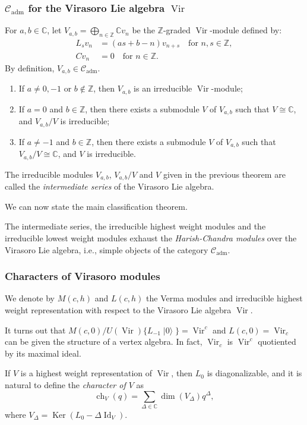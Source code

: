 \documentclass{beamer}
\DeclareMathOperator{\Id}{Id}
\DeclareMathOperator{\Ker}{Ker}
\DeclareMathOperator{\adm}{adm}
\DeclareMathOperator{\Vir}{Vir}
\DeclareMathOperator{\vac}{|0\rangle}
\DeclareMathOperator{\ch}{ch}
\begin{document}
\begin{frame}
  \frametitle{$\mathcal{C}_{\adm}$ for the Virasoro Lie algebra $\Vir$}
  For $a, b \in \mathbb{C}$, let $V_{a, b} = \bigoplus_{n \in \mathbb{Z}}\mathbb{C}v_n$ be the $\mathbb{Z}$-graded $\Vir$-module defined by:
  \begin{align*}
    L_sv_n &= (as + b - n)v_{n + s} \quad \text{for $n, s \in \mathbb{Z}$}, \\
    Cv_n &= 0 \quad \text{for $n \in \mathbb{Z}$}.
  \end{align*}
  By definition, $V_{a, b} \in \mathcal{C}_{\adm}$.

  \begin{theorem}
    \label{thr:1}
    \begin{enumerate}
    \item If $a \neq 0, -1$ or $b \notin \mathbb{Z}$, then $V_{a, b}$ is an irreducible $\Vir$-module;
    \item If $a = 0$ and $b \in \mathbb{Z}$, then there exists a submodule $V$ of $V_{a, b}$ such that $V \cong \mathbb{C}$, and $V_{a, b}/V$ is irreducible;
    \item If $a \neq -1$ and $b \in \mathbb{Z}$, then there exists a submodule $V$ of $V_{a, b}$ such that $V_{a, b}/V \cong \mathbb{C}$, and $V$ is irreducible.
    \end{enumerate}
  \end{theorem}
\end{frame}

\begin{frame}
  The irreducible modules $V_{a, b}$, $V_{a, b}/V$ and $V$ given in the previous theorem are called the \emph{intermediate series} of the Virasoro Lie algebra.

  We can now state the main classification theorem.
  \begin{theorem}
    \label{thr:2}
    The intermediate series, the irreducible highest weight modules and the irreducible lowest weight modules exhaust the \emph{Harish-Chandra modules} over the Virasoro Lie algebra, i.e., simple objects of the category $\mathcal{C}_{\adm}$.
  \end{theorem}
\end{frame}

\begin{frame}
  \frametitle{Characters of Virasoro modules}
  We denote by $M(c, h)$ and $L(c, h)$ the Verma modules and irreducible highest weight representation with respect to the Virasoro Lie algebra $\Vir$.

  It turns out that $M(c, 0)/U(\Vir)\{L_{-1}\vac\} = \Vir^c$ and $L(c, 0) = \Vir_c$ can be given the structure of a vertex algebra.
  In fact, $\Vir_c$ is $\Vir^c$ quotiented by its maximal ideal.

  If $V$ is a highest weight representation of $\Vir$, then $L_0$ is diagonalizable, and it is natural to define the \emph{character of $V$} as
  \begin{equation*}
    \ch_V(q) = \sum_{\Delta \in \mathbb{C}}\dim(V_{\Delta})q^{\Delta},
  \end{equation*}
  where $V_{\Delta} = \Ker(L_0 - \Delta\Id_V)$.
\end{frame}
\end{document}
